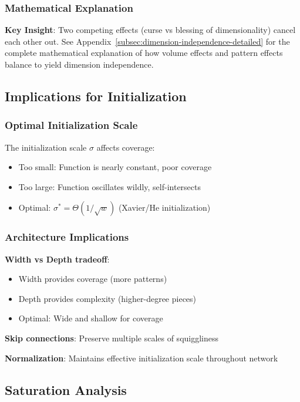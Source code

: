 \subsubsection{Mathematical Explanation}

\textbf{Key Insight}: Two competing effects (curse vs blessing of dimensionality) cancel each other out. See Appendix~\ref{subsec:dimension-independence-detailed} for the complete mathematical explanation of how volume effects and pattern effects balance to yield dimension independence.

\subsection{Implications for Initialization}

\subsubsection{Optimal Initialization Scale}

The initialization scale $\sigma$ affects coverage:
\begin{itemize}
    \item Too small: Function is nearly constant, poor coverage
    \item Too large: Function oscillates wildly, self-intersects
    \item Optimal: $\sigma^* = \Theta(1/\sqrt{w})$ (Xavier/He initialization)
\end{itemize}

\subsubsection{Architecture Implications}

\textbf{Width vs Depth tradeoff}:
\begin{itemize}
    \item Width provides coverage (more patterns)
    \item Depth provides complexity (higher-degree pieces)
    \item Optimal: Wide and shallow for coverage
\end{itemize}

\textbf{Skip connections}: Preserve multiple scales of squiggliness

\textbf{Normalization}: Maintains effective initialization scale throughout network

\subsection{Saturation Analysis}


